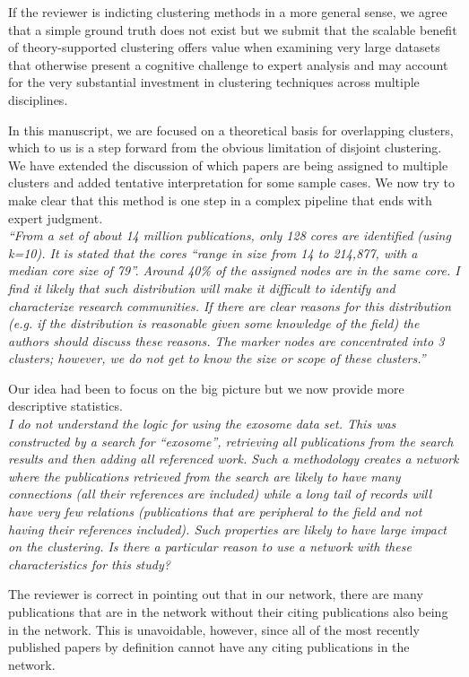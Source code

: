 \documentclass[11pt, oneside]{article}   	%
\begin{document}
If the reviewer is indicting clustering methods in a more general sense, we agree that a simple ground truth does not exist but we submit that the scalable benefit of theory-supported clustering offers
value when examining very large datasets that otherwise present a cognitive challenge to expert analysis and may account for the very substantial investment in clustering techniques across multiple disciplines. 

In this manuscript, we are focused on a theoretical basis for overlapping clusters, which to us is a step forward from the obvious limitation of disjoint clustering. We have extended the discussion of which papers are being assigned to multiple clusters and added tentative interpretation for some sample cases. We now try to make clear that this method is one step in a complex pipeline that ends with expert judgment.\\

\emph{``From a set of about 14 million publications, only 128 cores are identified (using k=10). It is stated that the cores “range in size from 14 to 214,877, with a median core size of 79”. Around 40\% of the assigned nodes are in the same core. I find it likely that such distribution will make it difficult to identify and characterize research communities. If there are clear reasons for this distribution (e.g. if the distribution is reasonable given some knowledge of the field) the authors should discuss these reasons. The marker nodes are concentrated into 3 clusters; however, we do not get to know the size or scope of these clusters.''}

Our idea had been to focus on the big picture but we now provide more descriptive statistics. \\

\emph{I do not understand the logic for using the exosome data set. This was constructed by a search for “exosome”, retrieving all publications from the search results and then adding all referenced work. Such a methodology creates a network where the publications retrieved from the search are likely to have many connections (all their references are included) while a long tail of records will have very few relations (publications that are peripheral to the field and not having their references included). Such properties are likely to have large impact on the clustering. Is there a particular reason to use a network with these characteristics for this study?}

The reviewer is correct in pointing out that in our network, there are many publications that are in the network without their citing publications also being in the network. This is unavoidable, however, since all of the most recently published papers by definition cannot have any citing publications in the network.  
\end{document}
